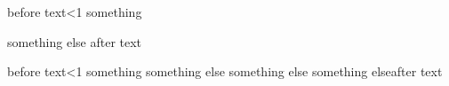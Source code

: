 before text\ifodd\x<1 something

\or something else \fi after text

before text\ifodd\x<1 something
\or something else
\or something else
\or something else\fi after text
